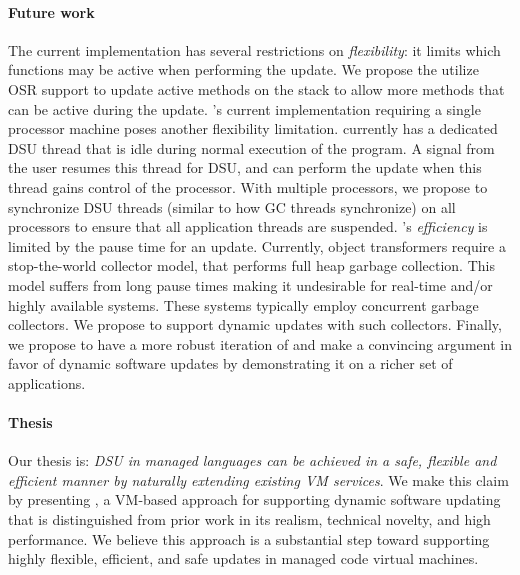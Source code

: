 \paragraph{Future work} The current implementation has several restrictions
on \emph{flexibility}: it limits which functions may be active when performing
the update. We propose the utilize \acf{OSR} support to update active
methods on the stack to allow more methods that can be active during the
update. \DSU{}'s current implementation requiring a single processor
machine poses another flexibility limitation. \DSU{} currently has a
dedicated DSU thread that is idle during normal execution of the program. A
signal from the user resumes this thread for DSU, and \DSU{} can perform
the update when this thread gains control of the processor. With
multiple processors, we propose to synchronize DSU threads (similar to how
GC threads synchronize) on all processors to ensure that all application
threads are suspended.  \DSU{}'s \emph{efficiency} is limited by the pause
time for an update.  Currently, object transformers require a
stop-the-world collector model, that performs full heap garbage collection.
This model suffers from long pause times making it undesirable for
real-time and/or highly available systems. These systems
typically employ concurrent garbage collectors. We propose to support dynamic
updates with such collectors.  Finally, we propose to have a more robust
iteration of \DSU{} and make a convincing argument in favor of dynamic
software updates by demonstrating it on a richer set of applications.

\paragraph{Thesis}
Our thesis is: \emph{\acf{DSU} in managed languages can be
achieved in a safe, flexible and efficient manner by naturally extending
existing VM services}. We make this claim by presenting \DSU{}, a VM-based
approach for supporting dynamic software updating that is
distinguished from prior work in its realism, technical novelty, and
high performance.  We believe this approach is a substantial step
toward supporting highly flexible, efficient, and safe updates in
managed code virtual machines.  

